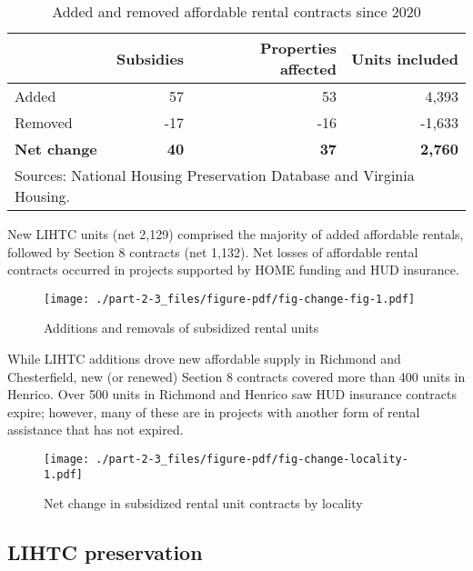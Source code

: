 \documentclass[
  letterpaper,
  DIV=11,
  numbers=noendperiod]{scrreprt}
\begin{document}
\hypertarget{tbl-change-table}{}
\begin{table}
\caption{\label{tbl-change-table}Added and removed affordable rental contracts since 2020 }\tabularnewline

\centering
\begin{tabular}{l|r|r|r}
\hline
 & Subsidies & Properties affected & Units included\\
\hline
Added & 57 & 53 & 4,393\\
\hline
Removed & -17 & -16 & -1,633\\
\hline
\textbf{Net change} & \textbf{40} & \textbf{37} & \textbf{2,760}\\
\hline
\multicolumn{4}{l}{\rule{0pt}{1em}Sources: National Housing Preservation Database and Virginia Housing.}\\
\end{tabular}
\end{table}

New LIHTC units (net 2,129) comprised the majority of added affordable
rentals, followed by Section 8 contracts (net 1,132). Net losses of
affordable rental contracts occurred in projects supported by HOME
funding and HUD insurance.

\begin{figure}

{\centering \texttt{[image: ./part-2-3\_files/figure-pdf/fig-change-fig-1.pdf]}

}

\caption{\label{fig-change-fig}Additions and removals of subsidized
rental units}

\end{figure}

While LIHTC additions drove new affordable supply in Richmond and
Chesterfield, new (or renewed) Section 8 contracts covered more than 400
units in Henrico. Over 500 units in Richmond and Henrico saw HUD
insurance contracts expire; however, many of these are in projects with
another form of rental assistance that has not expired.

\begin{figure}

{\centering \texttt{[image: ./part-2-3\_files/figure-pdf/fig-change-locality-1.pdf]}

}

\caption{\label{fig-change-locality}Net change in subsidized rental unit
contracts by locality}

\end{figure}

\hypertarget{lihtc-preservation}{%
\subsection{LIHTC preservation}\label{lihtc-preservation}}
\end{document}
